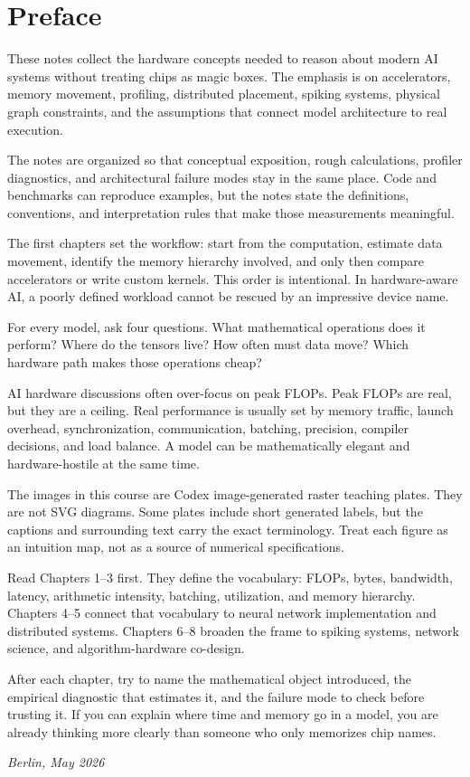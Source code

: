 \section*{Preface}

These notes collect the hardware concepts needed to reason about modern AI systems without treating chips as magic boxes. The emphasis is on accelerators, memory movement, profiling, distributed placement, spiking systems, physical graph constraints, and the assumptions that connect model architecture to real execution.

The notes are organized so that conceptual exposition, rough calculations, profiler diagnostics, and architectural failure modes stay in the same place. Code and benchmarks can reproduce examples, but the notes state the definitions, conventions, and interpretation rules that make those measurements meaningful.

The first chapters set the workflow: start from the computation, estimate data movement, identify the memory hierarchy involved, and only then compare accelerators or write custom kernels. This order is intentional. In hardware-aware AI, a poorly defined workload cannot be rescued by an impressive device name.

\begin{aside}
For every model, ask four questions. What mathematical operations does it perform? Where do the tensors live? How often must data move? Which hardware path makes those operations cheap?
\end{aside}

AI hardware discussions often over-focus on peak FLOPs. Peak FLOPs are real, but they are a ceiling. Real performance is usually set by memory traffic, launch overhead, synchronization, communication, batching, precision, compiler decisions, and load balance. A model can be mathematically elegant and hardware-hostile at the same time.

The images in this course are Codex image-generated raster teaching plates. They are not SVG diagrams. Some plates include short generated labels, but the captions and surrounding text carry the exact terminology. Treat each figure as an intuition map, not as a source of numerical specifications.

Read Chapters 1--3 first. They define the vocabulary: FLOPs, bytes, bandwidth, latency, arithmetic intensity, batching, utilization, and memory hierarchy. Chapters 4--5 connect that vocabulary to neural network implementation and distributed systems. Chapters 6--8 broaden the frame to spiking systems, network science, and algorithm-hardware co-design.

After each chapter, try to name the mathematical object introduced, the empirical diagnostic that estimates it, and the failure mode to check before trusting it. If you can explain where time and memory go in a model, you are already thinking more clearly than someone who only memorizes chip names.

\bigskip
\noindent\textit{Berlin, May 2026}
